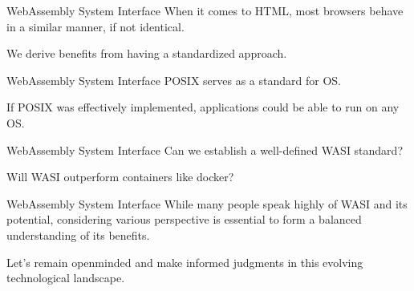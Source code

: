 \begin{frame}{WebAssembly System Interface}{}
    When it comes to HTML, most browsers behave in a similar manner, if not identical.
    \vspace{4ex}

    We derive benefits from having a standardized approach.
\end{frame}


\begin{frame}{WebAssembly System Interface}{}
    POSIX serves as a standard for OS.
    \vspace{4ex}

    If POSIX was effectively implemented, applications could be able to run on any OS.
\end{frame}


\begin{frame}{WebAssembly System Interface}{}
    Can we establish a well-defined WASI standard?
    \vspace{4ex}

    Will WASI outperform containers like docker?
\end{frame}


\begin{frame}{WebAssembly System Interface}{}
    While many people speak highly of WASI and its potential, considering various perspective is essential to form a balanced understanding of its benefits.
    \vspace{4ex}

    Let's remain openminded and make informed judgments in this evolving technological landscape.
\end{frame}
